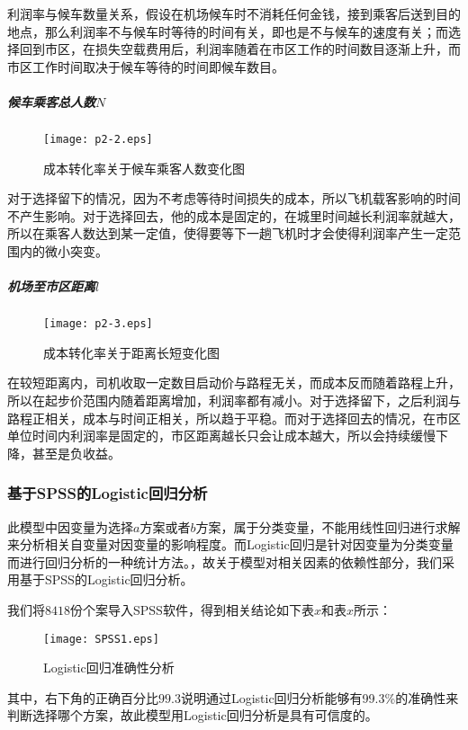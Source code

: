 \documentclass[withoutpreface,bwprint]{cumcmthesis} %
\begin{document}
利润率与候车数量关系，假设在机场候车时不消耗任何金钱，接到乘客后送到目的地点，那么利润率不与候车时等待的时间有关，即也是不与候车的速度有关；而选择回到市区，在损失空载费用后，利润率随着在市区工作的时间数目逐渐上升，而市区工作时间取决于候车等待的时间即候车数目。


\subparagraph{候车乘客总人数$N$}

 \begin{figure}[H]
  	\centering
	\texttt{[image: p2-2.eps]}
  	\caption{成本转化率关于候车乘客人数变化图}
  \end{figure}

对于选择留下的情况，因为不考虑等待时间损失的成本，所以飞机载客影响的时间不产生影响。对于选择回去，他的成本是固定的，在城里时间越长利润率就越大，所以在乘客人数达到某一定值，使得要等下一趟飞机时才会使得利润率产生一定范围内的微小突变。


\subparagraph{机场至市区距离$l$}

 \begin{figure}[H]
  	\centering
	\texttt{[image: p2-3.eps]}
  	\caption{成本转化率关于距离长短变化图}
  \end{figure}

在较短距离内，司机收取一定数目启动价与路程无关，而成本反而随着路程上升，所以在起步价范围内随着距离增加，利润率都有减小。对于选择留下，之后利润与路程正相关，成本与时间正相关，所以趋于平稳。而对于选择回去的情况，在市区单位时间内利润率是固定的，市区距离越长只会让成本越大，所以会持续缓慢下降，甚至是负收益。

\subsubsection{基于SPSS的Logistic回归分析}
此模型中因变量为选择$a$方案或者$b$方案，属于分类变量，不能用线性回归进行求解来分析相关自变量对因变量的影响程度。而Logistic回归是针对因变量为分类变量而进行回归分析的一种统计方法。\cite{bib:five}，故关于模型对相关因素的依赖性部分，我们采用基于SPSS的Logistic回归分析。

我们将$8418$份个案导入SPSS软件，得到相关结论如下表$x$和表$x$所示：

 \begin{figure}[H]
  	\centering
	\texttt{[image: SPSS1.eps]}
  	\caption{Logistic回归准确性分析}
  \end{figure}
其中，右下角的正确百分比$99.3$说明通过Logistic回归分析能够有99.3\%的准确性来判断选择哪个方案，故此模型用Logistic回归分析是具有可信度的。
\end{document}

